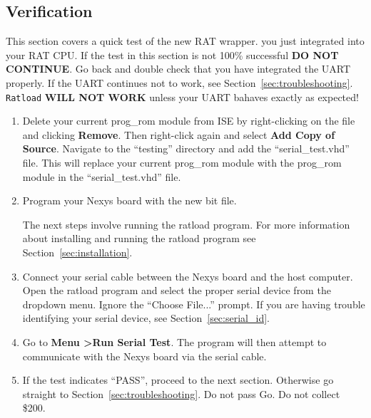\documentclass[notitlepage]{article}
\newcommand{\infosign}{\fontencoding{U}\fontfamily{futs}\huge\selectfont\char 116\relax}
\begin{document}
\subsection{Verification}
\label{sec:verification}
This section covers a quick test of the new RAT wrapper. you just integrated into your RAT CPU. If the test in this section is not 100\% successful \textbf{DO NOT CONTINUE}. Go back and double check that you have integrated the UART properly. If the UART continues not to work, see Section~\ref{sec:troubleshooting}. \texttt{Ratload} \textbf{WILL NOT WORK} unless your UART bahaves exactly as expected!

\begin{enumerate}
\item Delete your current prog\_rom module from ISE by right-clicking on the file and clicking \textbf{Remove}. Then right-click again and select \textbf{Add Copy of Source}. Navigate to the ``testing'' directory and add the ``serial\_test.vhd'' file. This will replace your current prog\_rom module with the prog\_rom module in the ``serial\_test.vhd'' file.

\item Program your Nexys board with the new bit file.

\begin{infobox}
  {\infosign} The next steps involve running the ratload program. For more information about installing and running the ratload program see Section~\ref{sec:installation}.
\end{infobox}

\item Connect your serial cable between the Nexys board and the host computer. Open the ratload program and select the proper serial device from the dropdown menu. Ignore the ``Choose File...'' prompt. If you are having trouble identifying your serial device, see Section~\ref{sec:serial_id}.

\item Go to \textbf{Menu \textgreater Run Serial Test}. The program will then attempt to communicate with the Nexys board via the serial cable.

\item If the test indicates ``PASS'', proceed to the next section. Otherwise go straight to Section~\ref{sec:troubleshooting}. Do not pass Go. Do not collect \$200.
\end{enumerate}
\end{document}
